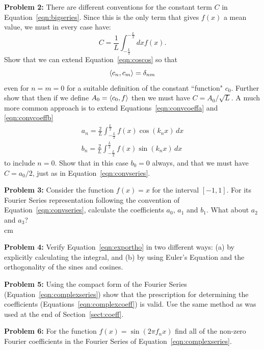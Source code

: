 \documentclass[12pt,oneside]{book}
\begin{document}
\noindent
{\bf Problem 2:} There are different conventions for the constant term $C$ in Equation~\ref{eqn:bigseries}.
Since this is the only term that gives $f(x)$ a mean value, we must in every case have:
\begin{displaymath}
C = \frac{1}{L} \int_{-\frac{L}{2}}^{-\frac{L}{2}}  dx f(x).
\end{displaymath}
Show that we can extend Equation~\ref{eqn:coscos} so that
\begin{displaymath}
\braket{c_n,c_m} = \delta_{n m}
\end{displaymath}
even for $n=m=0$ for a suitable definition of the constant ``function" $c_0$.  Further show that then if we define $A_0 = \braket{c_0, f}$ then we must have $C = A_0/\sqrt{L}$.   A much more common approach is to extend Equations~\ref{eqn:convcoeffa} and \ref{eqn:convcoeffb} 
\begin{eqnarray*}
a_n  = \frac{2}{L} \int_{-\frac{L}{2}}^{\frac{L}{2}} 
f(x) \cos( k_n x) \, dx  \\
b_n  = \frac{2}{L} \int_{-\frac{L}{2}}^{\frac{L}{2}} 
f(x) \sin( k_n x) \, dx 
\end{eqnarray*}
to include $n=0$.  Show that in this case $b_0 = 0$ always, and that we must have $C = a_0/2$, just as in Equation~\ref{eqn:convseries}. \\
\vskip 0.5cm

\noindent
{\bf Problem 3:}  Consider the function $f(x) = x$ for the interval $[-1,1]$.  For its
Fourier Series representation following the convention of Equation~\ref{eqn:convseries}, calculate the coefficients $a_0$, $a_1$ and $b_1$.  What about $a_2$ and $a_3$? \\
 cm

\noindent
{\bf Problem 4:} Verify Equation~\ref{eqn:exportho} in two different ways: (a) by explicitly calculating the integral, and (b) by using Euler's Equation and the orthogonality of the sines and cosines.\\
\vskip 0.5cm

\noindent
{\bf Problem 5:} Using the compact form of the Fourier Series (Equation~\ref{eqn:complexseries}) show that the prescription for determining the coefficients (Equations~\ref{eqn:complexcoeff}) is valid.  Use the same method as was used at the end of Section~\ref{sect:coeff}. \\
\vskip 0.5cm


\noindent
{\bf Problem 6:} For the function $f(x) = \sin(2 \pi f_n x )$ find all of the non-zero Fourier coefficients in the Fourier Series of Equation~\ref{eqn:complexseries}.\\
\vskip 0.5cm
\end{document}
